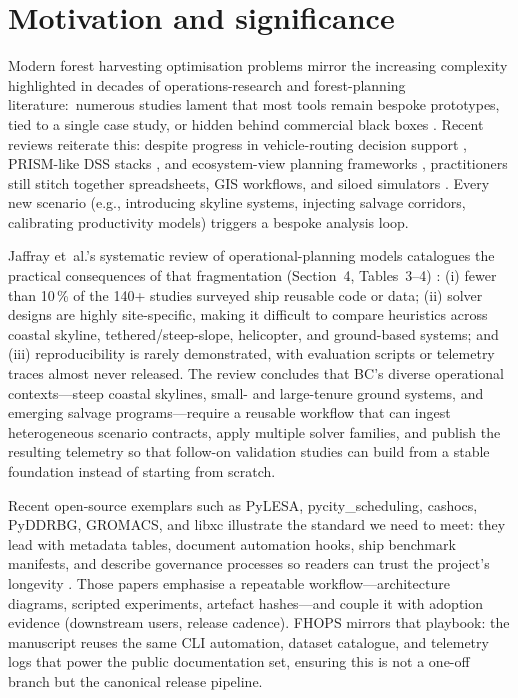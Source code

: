 \section{Motivation and significance}

Modern forest harvesting optimisation problems mirror the increasing complexity highlighted in decades of operations-research and forest-planning literature:\ numerous studies lament that most tools remain bespoke prototypes, tied to a single case study, or hidden behind commercial black boxes \cite{henkelman1978gpssv,weintraub1996new,heinimann2007forest,buongiorno2003decision,kangas2008decision}. Recent reviews reiterate this: despite progress in vehicle-routing decision support \cite{audy2023planning}, PRISM-like DSS stacks \cite{nguyen2022prism}, and ecosystem-view planning frameworks \cite{labarre2025improve}, practitioners still stitch together spreadsheets, GIS workflows, and siloed simulators \cite{ulvdal2022uncertainty,nelson2003forestmodels}. Every new scenario (e.g., introducing skyline systems, injecting salvage corridors, calibrating productivity models) triggers a bespoke analysis loop.

Jaffray et~al.’s systematic review of operational-planning models catalogues the practical consequences of that fragmentation (Section~4, Tables~3–4) \cite{jaffray2025systematic}: (i) fewer than 10\,\% of the 140+ studies surveyed ship reusable code or data; (ii) solver designs are highly site-specific, making it difficult to compare heuristics across coastal skyline, tethered/steep-slope, helicopter, and ground-based systems; and (iii) reproducibility is rarely demonstrated, with evaluation scripts or telemetry traces almost never released. The review concludes that BC’s diverse operational contexts—steep coastal skylines, small- and large-tenure ground systems, and emerging salvage programs—require a reusable workflow that can ingest heterogeneous scenario contracts, apply multiple solver families, and publish the resulting telemetry so that follow-on validation studies can build from a stable foundation instead of starting from scratch.

Recent open-source exemplars such as PyLESA, pycity\_scheduling, cashocs, PyDDRBG, GROMACS, and libxc illustrate the standard we need to meet: they lead with metadata tables, document automation hooks, ship benchmark manifests, and describe governance processes so readers can trust the project’s longevity \cite{Lyden2021PyLESA,Schwarz2021pycity,Blauth2023cashocs,Ahrari2022PyDDRBG,Abraham2015GROMACS,Lehtola2018libxc}. Those papers emphasise a repeatable workflow—architecture diagrams, scripted experiments, artefact hashes—and couple it with adoption evidence (downstream users, release cadence). FHOPS mirrors that playbook: the manuscript reuses the same CLI automation, dataset catalogue, and telemetry logs that power the public documentation set, ensuring this is not a one-off branch but the canonical release pipeline.

